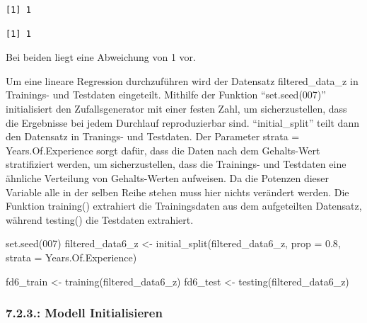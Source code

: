 \documentclass[
  letterpaper,
  DIV=11,
  numbers=noendperiod]{scrartcl}
\newenvironment{Shaded}{\begin{snugshade}}{\end{snugshade}}
\newcommand{\AttributeTok}[1]{\textcolor[rgb]{0.40,0.45,0.13}{#1}}
\newcommand{\DecValTok}[1]{\textcolor[rgb]{0.68,0.00,0.00}{#1}}
\newcommand{\FloatTok}[1]{\textcolor[rgb]{0.68,0.00,0.00}{#1}}
\newcommand{\FunctionTok}[1]{\textcolor[rgb]{0.28,0.35,0.67}{#1}}
\newcommand{\NormalTok}[1]{\textcolor[rgb]{0.00,0.23,0.31}{#1}}
\newcommand{\OtherTok}[1]{\textcolor[rgb]{0.00,0.23,0.31}{#1}}
\newcommand{\SpecialCharTok}[1]{\textcolor[rgb]{0.37,0.37,0.37}{#1}}
\begin{document}
\begin{verbatim}
[1] 1
\end{verbatim}

\begin{Shaded}
\end{Shaded}

\begin{verbatim}
[1] 1
\end{verbatim}

Bei beiden liegt eine Abweichung von 1 vor.

Um eine lineare Regression durchzuführen wird der Datensatz
filtered\_data\_z in Trainings- und Testdaten eingeteilt. Mithilfe der
Funktion ``set.seed(007)'' initialisiert den Zufallsgenerator mit einer
festen Zahl, um sicherzustellen, dass die Ergebnisse bei jedem Durchlauf
reproduzierbar sind. ``initial\_split'' teilt dann den Datensatz in
Tranings- und Testdaten. Der Parameter strata = Years.Of.Experience
sorgt dafür, dass die Daten nach dem Gehalts-Wert stratifiziert werden,
um sicherzustellen, dass die Trainings- und Testdaten eine ähnliche
Verteilung von Gehalts-Werten aufweisen. Da die Potenzen dieser Variable
alle in der selben Reihe stehen muss hier nichts verändert werden. Die
Funktion training() extrahiert die Trainingsdaten aus dem aufgeteilten
Datensatz, während testing() die Testdaten extrahiert.

\begin{Shaded}
\begin{Highlighting}[]
\FunctionTok{set.seed}\NormalTok{(}\DecValTok{007}\NormalTok{)  }
\NormalTok{filtered\_data6\_z }\OtherTok{\textless{}{-}} \FunctionTok{initial\_split}\NormalTok{(filtered\_data6\_z, }\AttributeTok{prop =} \FloatTok{0.8}\NormalTok{, }\AttributeTok{strata =}\NormalTok{ Years.Of.Experience)  }

\NormalTok{fd6\_train }\OtherTok{\textless{}{-}} \FunctionTok{training}\NormalTok{(filtered\_data6\_z)}
\NormalTok{fd6\_test }\OtherTok{\textless{}{-}} \FunctionTok{testing}\NormalTok{(filtered\_data6\_z)}
\end{Highlighting}
\end{Shaded}

\hypertarget{modell-initialisieren-1}{%
\subsubsection{7.2.3.: Modell
Initialisieren}\label{modell-initialisieren-1}}
\end{document}
